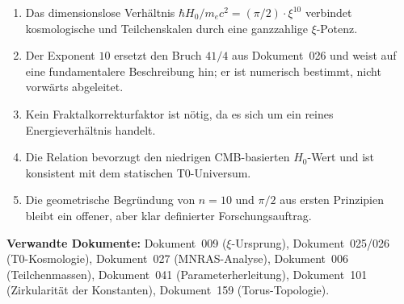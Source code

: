 \begin{foundation}
    \begin{enumerate}
        \item Das dimensionslose Verhältnis
              $\hbar H_0 / m_e c^2 = (\pi/2) \cdot \xi^{10}$ verbindet
              kosmologische und Teilchenskalen durch eine ganzzahlige
              $\xi$-Potenz.
        \item Der Exponent $10$ ersetzt den Bruch $41/4$ aus Dokument~026
              und weist auf eine fundamentalere Beschreibung hin; er ist
              numerisch bestimmt, nicht vorwärts abgeleitet.
        \item Kein Fraktal\-korrekturfaktor ist nötig, da es sich um ein
              reines Energieverhältnis handelt.
        \item Die Relation bevorzugt den niedrigen CMB-basierten
              $H_0$-Wert und ist konsistent mit dem statischen
              T0-Universum.
        \item Die geometrische Begründung von $n = 10$ und $\pi/2$ aus
              ersten Prinzipien bleibt ein offener, aber
              klar definierter Forschungsauftrag.
    \end{enumerate}
\end{foundation}

\vspace{1.5em}

\noindent\textbf{Verwandte Dokumente:}
Dokument~009 ($\xi$-Ursprung),
Dokument~025/026 (T0-Kosmologie),
Dokument~027 (MNRAS-Analyse),
Dokument~006 (Teilchenmassen),
Dokument~041 (Parameterherleitung),
Dokument~101 (Zirkularität der Konstanten),
Dokument~159 (Torus-Topologie).
